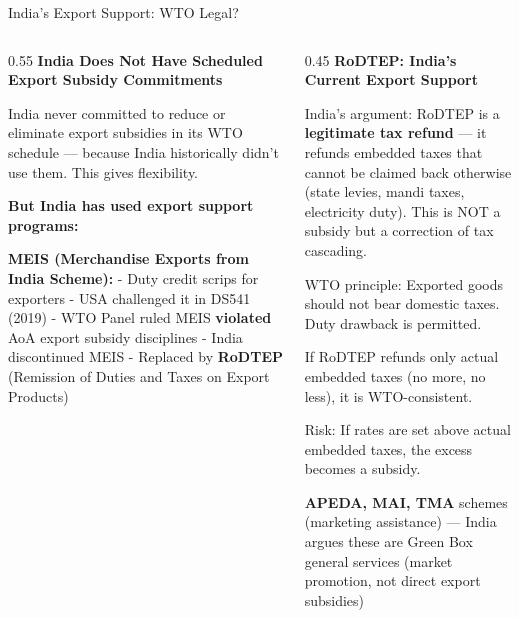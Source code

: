 \documentclass[
  ignorenonframetext,
  aspectratio=169,
]{beamer}
\makeatletter
\let\quarto@originallabel\label
\DeclareRobustCommand*{\label}[1]{\quarto@originallabel{#1}}
\makeatother
\begin{document}
\begin{frame}{India's Export Support: WTO Legal?}
\label{indias-export-support-wto-legal}
\begin{columns}[T]
\begin{column}{0.55\linewidth}
\textbf{India Does Not Have Scheduled Export Subsidy Commitments}

India never committed to reduce or eliminate export subsidies in its WTO
schedule --- because India historically didn't use them. This gives
flexibility.

\textbf{But India has used export support programs:}

\textbf{MEIS (Merchandise Exports from India Scheme):} - Duty credit
scrips for exporters - USA challenged it in DS541 (2019) - WTO Panel
ruled MEIS \textbf{violated} AoA export subsidy disciplines - India
discontinued MEIS - Replaced by \textbf{RoDTEP} (Remission of Duties and
Taxes on Export Products)
\end{column}

\begin{column}{0.45\linewidth}
\textbf{RoDTEP: India's Current Export Support}

India's argument: RoDTEP is a \textbf{legitimate tax refund} --- it
refunds embedded taxes that cannot be claimed back otherwise (state
levies, mandi taxes, electricity duty). This is NOT a subsidy but a
correction of tax cascading.

WTO principle: Exported goods should not bear domestic taxes. Duty
drawback is permitted.

If RoDTEP refunds only actual embedded taxes (no more, no less), it is
WTO-consistent.

Risk: If rates are set above actual embedded taxes, the excess becomes a
subsidy.

\textbf{APEDA, MAI, TMA} schemes (marketing assistance) --- India argues
these are Green Box general services (market promotion, not direct
export subsidies)
\end{column}
\end{columns}
\end{frame}
\end{document}
